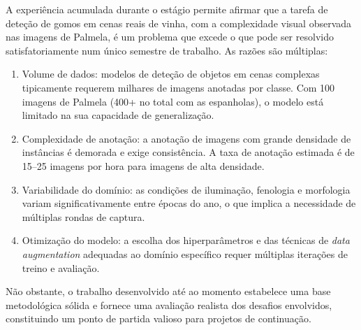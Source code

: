 A experiência acumulada durante o estágio permite afirmar que a tarefa de
deteção de gomos em cenas reais de vinha, com a complexidade visual observada
nas imagens de Palmela, é um problema que excede o que pode ser
resolvido satisfatoriamente num único semestre de trabalho. As razões são
múltiplas:

\begin{enumerate}
  \item Volume de dados: modelos de deteção de objetos em cenas
    complexas tipicamente requerem milhares de imagens anotadas por classe.
    Com 100 imagens de Palmela (400+ no total com as espanholas), o modelo
    está limitado na sua capacidade de generalização.

  \item Complexidade de anotação: a anotação de imagens com grande
    densidade de instâncias é demorada e exige consistência. A taxa de
    anotação estimada é de 15--25 imagens por hora para imagens de alta
    densidade.

  \item Variabilidade do domínio: as condições de iluminação,
    fenologia e morfologia variam significativamente entre épocas do ano,
    o que implica a necessidade de múltiplas rondas de captura.

  \item Otimização do modelo: a escolha dos hiperparâmetros e das
    técnicas de \textit{data augmentation} adequadas ao domínio específico
    requer múltiplas iterações de treino e avaliação.
\end{enumerate}

Não obstante, o trabalho desenvolvido até ao momento estabelece uma base
metodológica sólida e fornece uma avaliação realista dos desafios envolvidos,
constituindo um ponto de partida valioso para projetos de continuação.
